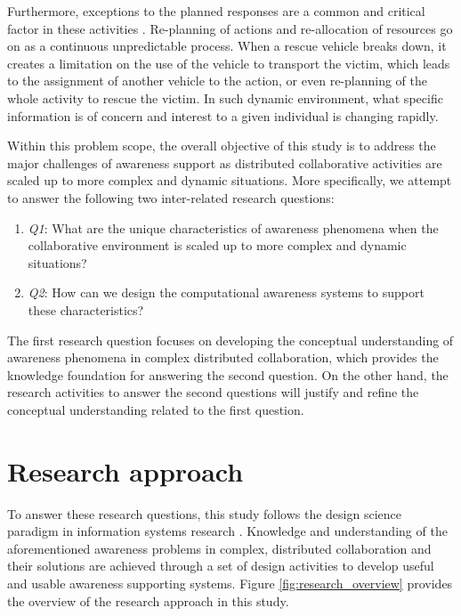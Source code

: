 Furthermore, exceptions to the planned responses are a common and critical factor in these activities \cite{Turoff2004}. Re-planning of actions and re-allocation of resources go on as a continuous unpredictable process. When a rescue vehicle breaks down, it creates a limitation on the use of the vehicle to transport the victim, which leads to the assignment of another vehicle to the action, or even re-planning of the whole activity to rescue the victim. In such dynamic environment, what specific information is of concern and interest to a given individual is changing rapidly.

Within this problem scope, the overall objective of this study is to address the major challenges of awareness support as distributed collaborative activities are scaled up to more complex and dynamic situations. More specifically, we attempt to answer the following two inter-related research questions:

\begin{enumerate}
\item \emph{Q1}: What are the unique characteristics of awareness phenomena when the collaborative environment is scaled up to more complex and dynamic situations? 

\item \emph{Q2}: How can we design the computational awareness systems to support these characteristics?
\end{enumerate}

The first research question focuses on developing the conceptual understanding of awareness phenomena in complex distributed collaboration, which provides the knowledge foundation for answering the second question. On the other hand, the research activities to answer the second questions will justify and refine the conceptual understanding related to the first question.

\section{Research approach} %
\label{sec:research_approach}
 To answer these research questions, this study follows the design science paradigm in information systems research \cite{Hevner2004}. Knowledge and understanding of the aforementioned awareness problems in complex, distributed collaboration and their solutions are achieved through a set of design activities to develop useful and usable awareness supporting systems. Figure \ref{fig:research_overview} provides the overview of the research approach in this study.

